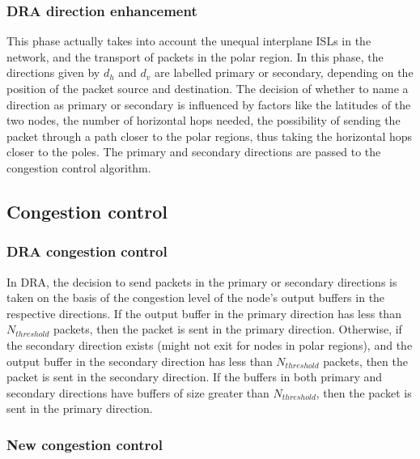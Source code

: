 \documentclass[10pt,conference, draftcls, letterpaper]{IEEEtran}
\begin{document}
\subsubsection{DRA direction enhancement}
This phase actually takes into account the unequal interplane ISLs in the network, and the transport of packets in the polar region. In this phase, the directions given by $d_h$ and $d_v$ are labelled primary or secondary, depending on the position of the packet source and destination. The decision of whether to name a direction as primary or secondary is influenced by factors like the latitudes of the two nodes, the number of horizontal hops needed, the possibility of sending the packet through a path closer to the polar regions, thus taking the horizontal hops closer to the poles. The primary and secondary directions are passed to the congestion control algorithm.\\
\subsection{Congestion control}
\subsubsection{DRA congestion control}
In DRA, the decision to send packets in the primary or secondary directions is taken on the basis of the congestion level of the node's output buffers in the respective directions. If the output buffer in the primary direction has less than $N_{threshold}$ packets, then the packet is sent in the primary direction. Otherwise, if the secondary direction exists (might not exit for nodes in polar regions), and the output buffer in the secondary direction has less than $N_{threshold}$ packets, then the packet is sent in the secondary direction. If the buffers in both primary and secondary directions have buffers of size greater than $N_{threshold}$, then the packet is sent in the primary direction.
\subsubsection{New congestion control}
\end{document}
